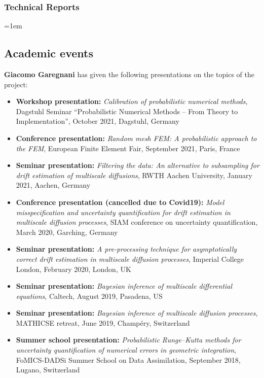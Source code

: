 \documentclass[10pt]{article}
\begin{document}
\subsubsection*{Technical Reports}

\sloppy
\emergencystretch=1em
\begin{enumerate}[label={[\arabic*]}]
	\item {}
\end{enumerate}

\subsection{Academic events}

\textbf{Giacomo Garegnani} has given the following presentations on the topics of the project:
\begin{itemize}
	\item \textbf{Workshop presentation:} \textit{Calibration of probabilistic numerical methods}, Dagstuhl Seminar ``Probabilistic Numerical Methods -- From Theory to Implementation'', October 2021, Dagstuhl, Germany
	\item \textbf{Conference presentation:} \textit{Random mesh FEM: A probabilistic approach to the FEM}, European Finite Element Fair, September 2021, Paris, France
	\item \textbf{Seminar presentation:} \textit{Filtering the data: An alternative to subsampling for drift estimation of multiscale diffusions}, RWTH Aachen University, January 2021, Aachen, Germany
	\item \textbf{Conference presentation (cancelled due to Covid19):} \textit{Model misspecification and uncertainty quantification for drift estimation in multiscale diffusion processes}, SIAM conference on uncertainty quantification, March 2020, Garching, Germany
	\item \textbf{Seminar presentation:} \textit{A pre-processing technique for asymptotically correct drift estimation in multiscale diffusion processes}, Imperial College London, February 2020, London, UK
	\item \textbf{Seminar presentation:} \textit{Bayesian inference of multiscale differential equations}, Caltech, August 2019, Pasadena, US
	\item \textbf{Seminar presentation:} \textit{Bayesian inference of multiscale diffusion processes}, MATHICSE retreat, June 2019, Champéry, Switzerland
	\item \textbf{Summer school presentation:} \textit{Probabilistic Runge--Kutta methods	for uncertainty quantification of numerical errors in geometric integration}, FoMICS-DADSi Summer School on Data Assimilation, September 2018,  Lugano, Switzerland

\end{itemize}
\end{document}
